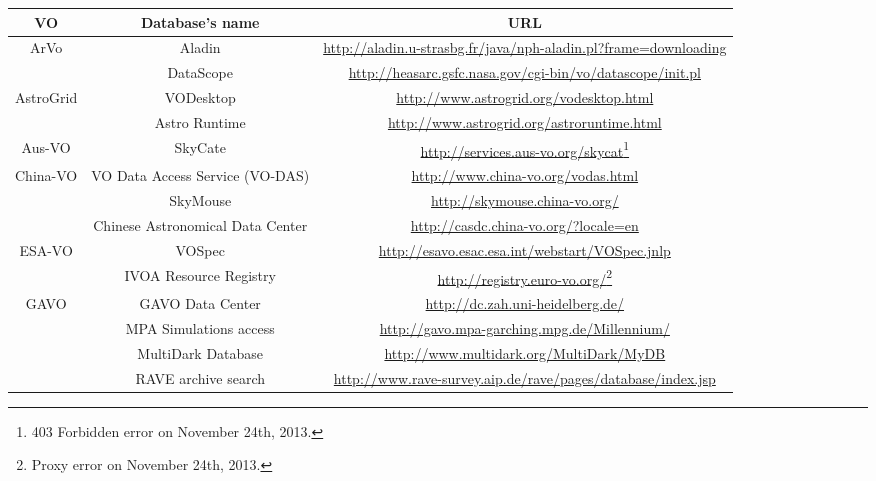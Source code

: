 \begin{table}%
\begin{tabular}{c|c|c}
    \hline
    \textbf{VO} & \textbf{Database's name} & \textbf{URL} \\
    \hline
    \multirow{2}{*}{ArVo} & Aladin
    & \url{http://aladin.u-strasbg.fr/java/nph-aladin.pl?frame=downloading} \\
    \cline{2-3}
     & DataScope
     & \url{http://heasarc.gsfc.nasa.gov/cgi-bin/vo/datascope/init.pl} \\
     \hline
    \multirow{2}{*}{AstroGrid} & VODesktop
    & \url{http://www.astrogrid.org/vodesktop.html}\\
    \cline{2-3}
     & Astro Runtime & \url{http://www.astrogrid.org/astroruntime.html} \\
     \hline
    Aus-VO & SkyCate
    & \url{http://services.aus-vo.org/skycat}\footnote{403 Forbidden error on 
                                                       November 24th, 2013.} \\ 
    \hline
    \multirow{3}{*}{China-VO} & VO Data Access Service (VO-DAS)
    & \url{http://www.china-vo.org/vodas.html} \\
    \cline{2-3}
     & SkyMouse & \url{http://skymouse.china-vo.org/} \\
     \cline{2-3}
     & Chinese Astronomical Data Center 
     & \url{http://casdc.china-vo.org/?locale=en} \\
     \hline
    \multirow{2}{*}{ESA-VO} & VOSpec
    & \url{http://esavo.esac.esa.int/webstart/VOSpec.jnlp} \\
     \cline{2-3}
     & IVOA Resource Registry
     & \url{http://registry.euro-vo.org/}\footnote{Proxy error on November 24th,
                                                   2013.} \\
     \hline
    \multirow{5}{*}{GAVO} & GAVO Data Center
    & \url{http://dc.zah.uni-heidelberg.de/} \\
    \cline{2-3}
     & MPA Simulations access
     & \url{http://gavo.mpa-garching.mpg.de/Millennium/} \\
     \cline{2-3}
     & MultiDark Database
     & \url{http://www.multidark.org/MultiDark/MyDB} \\
     \cline{2-3}
     & RAVE archive search
     & \url{http://www.rave-survey.aip.de/rave/pages/database/index.jsp} \\

\end{tabular}
\end{table}
